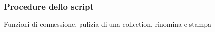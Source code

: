 \documentclass[xcolor=svgnames, aspectratio=169]{beamer}
\begin{document}

\subsubsection{Procedure dello script}

\begin{frame}{Funzioni di connessione, pulizia di una collection, rinomina e stampa}
    \begin{columns}[t]
        
        \vspace*{-32pt}
        \begin{figure}[H]
            \centering
            \noindent{}
        \end{figure}
    \end{columns}
\end{frame}

\end{document}
